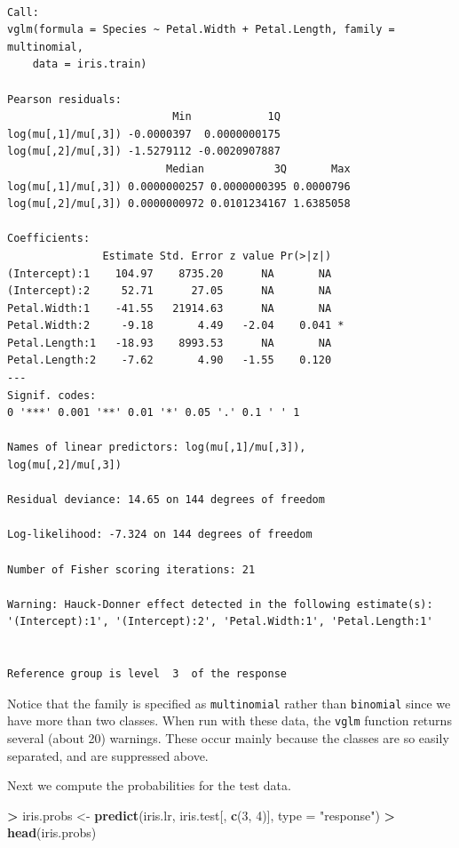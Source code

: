 \documentclass[]{krantz}
\makeatletter
\newenvironment{Shaded}{\begin{snugshade}}{\end{snugshade}}
\newcommand{\DataTypeTok}[1]{\textcolor[rgb]{0.27,0.27,0.27}{#1}}
\newcommand{\DecValTok}[1]{\textcolor[rgb]{0.06,0.06,0.06}{#1}}
\newcommand{\KeywordTok}[1]{\textcolor[rgb]{0.27,0.27,0.27}{\textbf{#1}}}
\newcommand{\NormalTok}[1]{#1}
\newcommand{\OperatorTok}[1]{\textcolor[rgb]{0.43,0.43,0.43}{\textbf{#1}}}
\newcommand{\StringTok}[1]{\textcolor[rgb]{0.5,0.5,0.5}{#1}}
\newenvironment{kframe}{%
\medskip{}
\setlength{\fboxsep}{.8em}
 \def\at@end@of@kframe{}%
 \ifinner\ifhmode%
  \def\at@end@of@kframe{\end{minipage}}%
  \begin{minipage}{\columnwidth}%
 \fi\fi%
 \def\FrameCommand##1{\hskip\@totalleftmargin \hskip-\fboxsep
 \colorbox{shadecolor}{##1}\hskip-\fboxsep
     \hskip-\linewidth \hskip-\@totalleftmargin \hskip\columnwidth}%
 \MakeFramed {\advance\hsize-\width
   \@totalleftmargin\z@ \linewidth\hsize
   \@setminipage}}%
 {\par\unskip\endMakeFramed%
 \at@end@of@kframe}
\renewenvironment{Shaded}{\begin{kframe}}{\end{kframe}}
\makeatother
\begin{document}
\begin{verbatim}

Call:
vglm(formula = Species ~ Petal.Width + Petal.Length, family = multinomial, 
    data = iris.train)

Pearson residuals:
                          Min            1Q
log(mu[,1]/mu[,3]) -0.0000397  0.0000000175
log(mu[,2]/mu[,3]) -1.5279112 -0.0020907887
                         Median           3Q       Max
log(mu[,1]/mu[,3]) 0.0000000257 0.0000000395 0.0000796
log(mu[,2]/mu[,3]) 0.0000000972 0.0101234167 1.6385058

Coefficients: 
               Estimate Std. Error z value Pr(>|z|)  
(Intercept):1    104.97    8735.20      NA       NA  
(Intercept):2     52.71      27.05      NA       NA  
Petal.Width:1    -41.55   21914.63      NA       NA  
Petal.Width:2     -9.18       4.49   -2.04    0.041 *
Petal.Length:1   -18.93    8993.53      NA       NA  
Petal.Length:2    -7.62       4.90   -1.55    0.120  
---
Signif. codes:  
0 '***' 0.001 '**' 0.01 '*' 0.05 '.' 0.1 ' ' 1

Names of linear predictors: log(mu[,1]/mu[,3]), 
log(mu[,2]/mu[,3])

Residual deviance: 14.65 on 144 degrees of freedom

Log-likelihood: -7.324 on 144 degrees of freedom

Number of Fisher scoring iterations: 21 

Warning: Hauck-Donner effect detected in the following estimate(s):
'(Intercept):1', '(Intercept):2', 'Petal.Width:1', 'Petal.Length:1'


Reference group is level  3  of the response
\end{verbatim}

Notice that the family is specified as \texttt{multinomial} rather than \texttt{binomial} since we have more than two classes. When run with these data, the \texttt{vglm} function returns several (about 20) warnings. These occur mainly because the classes are so easily separated, and are suppressed above.

Next we compute the probabilities for the test data.

\begin{Shaded}
\begin{Highlighting}[]
\OperatorTok{>}\StringTok{ }\NormalTok{iris.probs <-}\StringTok{ }\KeywordTok{predict}\NormalTok{(iris.lr, iris.test[, }\KeywordTok{c}\NormalTok{(}\DecValTok{3}\NormalTok{, }\DecValTok{4}\NormalTok{)], }\DataTypeTok{type =} \StringTok{"response"}\NormalTok{)}
\OperatorTok{>}\StringTok{ }\KeywordTok{head}\NormalTok{(iris.probs)}
\end{Highlighting}
\end{Shaded}
\end{document}
